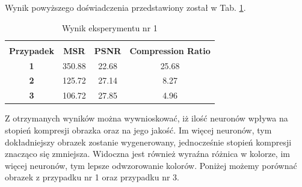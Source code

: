\documentclass[12pt]{article}
\begin{document}
Wynik powyższego doświadczenia przedstawiony został w Tab.
\ref{wynik eksperymentu 1}.

\begin{table}[h!]
 \caption{Wynik eksperymentu nr 1}
 \centering
 \vspace{0.2cm}
 \begin{tabular}{c c c c}
  \hline\hline\\[-0.4cm]
  \textbf{Przypadek} & \textbf{MSR} & \textbf{PSNR} & \textbf{Compression Ratio} \\[0.1cm]
  \textbf{1} & 350.88 & 22.68 & 25.68  \\
  \textbf{2} & 125.72 & 27.14 & 8.27  \\
  \textbf{3} & 106.72 & 27.85 & 4.96  \\ [0.1cm]
  \hline
 \end{tabular}
 \label{wynik eksperymentu 1}
\end{table}

Z otrzymanych wyników można wywnioskować, iż ilość neuronów wpływa na stopień kompresji obrazka oraz na jego jakość. Im więcej neuronów, tym dokładniejszy obrazek zostanie wygenerowany, jednocześnie stopień kompresji znacząco się zmniejsza. Widoczna jest również wyraźna różnica w kolorze, im więcej neuronów, tym lepsze odwzorowanie kolorów. Poniżej możemy porównać obrazek z przypadku nr 1 oraz przypadku nr 3.
\end{document}
